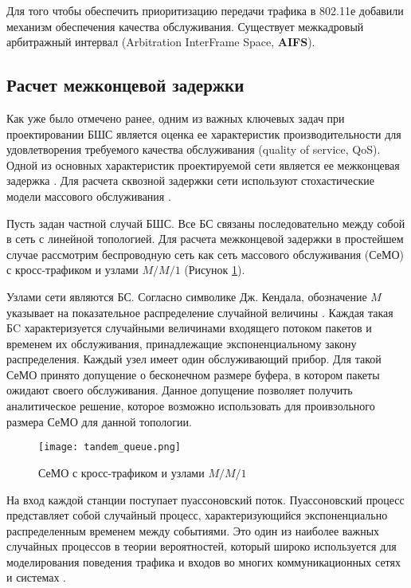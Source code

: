 Для того чтобы обеспечить приоритизацию передачи трафика в 802.11е добавили механизм обеспечения качества обслуживания. Существует межкадровый арбитражный интервал (Arbitration InterFrame Space, \textbf{AIFS}).

\subsection{Расчет межконцевой задержки}\label{part4_e2e_delay_section}

Как уже было отмечено ранее, одним из важных ключевых задач при проектировании БШС является оценка ее характеристик производительности для удовлетворения требуемого качества обслуживания (quality of service, QoS). Одной из основных характеристик проектируемой сети является ее межконцевая задержка \cite{Vishnevsky2016_Methods_of_performance, Wang2017, Liu2016, Chen2019, Hosni2017, Capone2019, Abbas2017, Seliem2019, Malandra2018, Kalor2018, Larionov2019, Gao2016}. Для расчета сквозной задержки сети используют стохастические модели массового обслуживания \cite{Vishnevsky2016_Methods_of_performance, Wang2017, Liu2016, Malandra2018, Larionov2019, Gao2016}. 

Пусть задан частной случай БШС. Все БС связаны последовательно между собой в сеть с линейной топологией. Для расчета межконцевой задержки в простейшем случае рассмотрим беспроводную сеть как сеть массового обслуживания (СеМО) с кросс-трафиком и узлами $M/M/1$ (Рисунок \cref{fig:tandem_queue}). 

Узлами сети являются БС. Согласно символике Дж. Кендала, обозначение $M$ указывает на показательное распределение случайной величины \cite{VishnevskyBook, Kleinrock1975}. Каждая такая БC характеризуется случайными величинами входящего потоком пакетов и временем их обслуживания, принадлежащие экспоненциальному закону распределения. Каждый узел имеет один обслуживающий прибор. Для такой СеМО принято допущение о бесконечном размере буфера, в котором пакеты ожидают своего обслуживания. Данное допущение позволяет получить аналитическое решение, которое возможно использовать для проивзольного размера СеМО для данной топологии.

\begin{figure}[h!]
  \centering
   \texttt{[image: tandem\_queue.png]}
\caption{СеМО с кросс-трафиком и узлами $M/M/1$}
\label{fig:tandem_queue}
\end{figure}

На вход каждой станции поступает пуассоновский поток. Пуассоновский процесс представляет собой случайный процесс, характеризующийся  экспоненциально распределенным временем между событиями. Это один из наиболее важных случайных процессов в теории вероятностей, который широко используется для моделирования поведения трафика и входов во многих коммуникационных сетях и системах \cite{Kalor2018, Gao2016, Malandra2018, Seliem2019}. 

